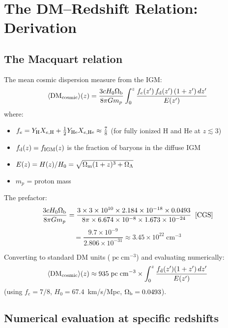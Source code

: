 \documentclass[11pt]{article}
\newcommand{\Ob}{\Omega_{\rm b}}
\newcommand{\Om}{\Omega_{\rm m}}
\newcommand{\fIGM}{f_{\rm IGM}}
\newcommand{\fd}{f_{\rm d}}
\newcommand{\fe}{f_e}
\newcommand{\DMcosmic}{\langle\mathrm{DM}_{\rm cosmic}\rangle}
\newcommand{\pc}{\;\mathrm{pc\;cm}^{-3}}
\begin{document}
\section{The DM--Redshift Relation: Derivation}
\label{sec:DM-derivation}

\subsection{The Macquart relation}

The mean cosmic dispersion measure from the IGM:
\begin{equation}
\DMcosmic(z) = \frac{3 c H_0 \Ob}{8\pi G m_p}
\int_0^z \frac{\fe(z')\,\fd(z')\,(1+z')\,dz'}{E(z')}
\label{eq:DM-integral}
\end{equation}
where:
\begin{itemize}
\item $\fe = Y_{\rm H} X_{e,\rm H} + \frac{1}{2}Y_{\rm He} X_{e,\rm He}
  \approx \frac{7}{8}$ (for fully ionized H and He at $z \lesssim 3$)
\item $\fd(z) = \fIGM(z)$ is the fraction of baryons in the diffuse IGM
\item $E(z) = H(z)/H_0 = \sqrt{\Om(1+z)^3 + \Omega_\Lambda}$
\item $m_p$ = proton mass
\end{itemize}

The prefactor:
\begin{equation}
\frac{3 c H_0 \Ob}{8\pi G m_p}
= \frac{3 \times 3 \times 10^{10} \times 2.184 \times 10^{-18} \times 0.0493}
{8\pi \times 6.674 \times 10^{-8} \times 1.673 \times 10^{-24}}
\;\;\text{[CGS]}
\end{equation}
\begin{equation}
= \frac{9.7 \times 10^{-9}}{2.806 \times 10^{-31}}
\approx 3.45 \times 10^{22}\;\text{cm}^{-3}
\end{equation}

Converting to standard DM units ($\pc$) and evaluating numerically:
\begin{equation}
\DMcosmic(z) \approx 935\pc \times
\int_0^z \frac{\fd(z')(1+z')\,dz'}{E(z')}
\label{eq:DM-numerical}
\end{equation}
(using $\fe = 7/8$, $H_0 = 67.4$~km/s/Mpc, $\Ob = 0.0493$).

\subsection{Numerical evaluation at specific redshifts}
\end{document}
